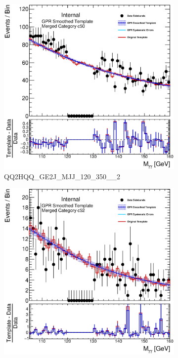 \begin{figure}
\begin{center}
\begin{subfigure}[T]{0.49\linewidth}
	\centering
	\includegraphics[width=\linewidth]{figures/background/gpr/coupCatTemplates/GPR_Smoothed_Plot_hmgg_c50.eps}
	\caption{\tiny{QQ2HQQ\_GE2J\_MJJ\_120\_350\_\_2}}
\end{subfigure}
\begin{subfigure}[T]{0.49\linewidth}
	\centering
	\includegraphics[width=\linewidth]{figures/background/gpr/coupCatTemplates/GPR_Smoothed_Plot_hmgg_c52.eps}

\end{subfigure}
\end{center}
\end{figure}
